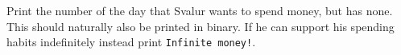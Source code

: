

Print the number of the day that Svalur wants to spend money, but
has none. This should naturally also be printed in binary. If he
can support his spending habits indefinitely instead print
\texttt{Infinite money!}.
